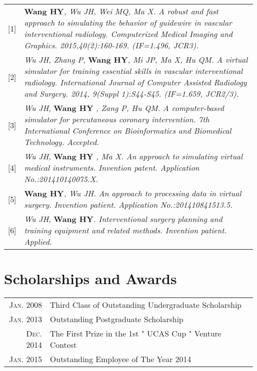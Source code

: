 \documentclass[a4paper,10pt]{article} %
\begin{document}
\begin{tabular}{p{0.3cm}p{15.0cm}}
\textsc{[1]} & \textbf{Wang HY}\emph{, Wu JH, Wei MQ, Ma X. A robust and fast approach to simulating the behavior of guidewire in vascular interventional radiology. Computerized Medical Imaging and Graphics. 2015,40(2):160-169. (IF=1.496, JCR3).}\\

\textsc{[2]} & \emph{Wu JH, Zhang P,} \textbf{Wang HY}\emph{, Mi JP, Ma X, Hu QM. A virtual simulator for training essential skills in vascular interventional radiology. International Journal of Computer Assisted Radiology and Surgery. 2014, 9(Suppl 1):S44-S45. (IF=1.659, JCR2/3).}\\

\textsc{[3]} & \emph{Wu JH,} \textbf{ Wang HY} \emph{, Zang P, Hu QM. A computer-based simulator for percutaneous coronary intervention. 7th International Conference on Bioinformatics and Biomedical Technology. Accepted.} \\

\textsc{[4]} & \emph{Wu JH,} \textbf{ Wang HY} \emph{, Ma X. An approach to simulating virtual medical instruments. Invention patent. Application No.:201410140075.X.} \\

\textsc{[5]} & \textbf{Wang HY}\emph{, Wu JH. An approach to processing data in virtual surgery. Invention patient. Application No.:201410841513.5.} \\

\textsc{[6]} & \emph{Wu JH,} \textbf{Wang HY}\emph{. Interventional surgery planning and training equipment and related methods. Invention patient. Applied. }\\

\end{tabular}



\section{Scholarships and Awards}

\begin{tabular}{rl}
\textsc{Jan.} 2008 & Third Class of Outstanding Undergraduate Scholarship \\

\textsc{Jan.} 2013 & Outstanding Postgraduate Scholarship \\

\textsc{Dec.} 2014 & The First Prize in the 1st " UCAS Cup " Venture Contest \\

\textsc{Jan.} 2015 & Outstanding Employee of The Year 2014 \\
\end{tabular}
\end{document}

